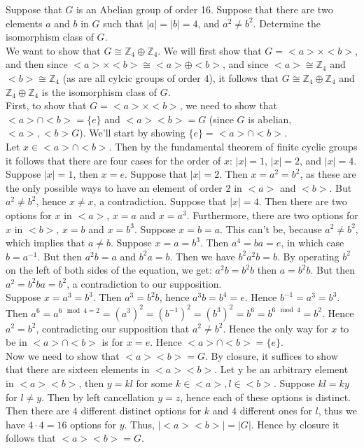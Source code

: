 \documentclass{article}
\newcommand{\Z}{\mathbb{Z}}
\begin{document}
 Suppose that $G$ is an Abelian group of order 16. Suppose that there are two elements $a$ and $b$ in $G$ such that $|a| = |b| = 4$, and $a^2 \ne b^2$. Determine the isomorphism class of $G$.\\

 We want to show that $G\cong \Z_4\oplus \Z_4$. We will first show that $G = <a>\times <b>$, and then since $<a>\times<b>\cong <a>\oplus<b>$, and since $<a>\cong \Z_4$ and $<b>\cong \Z_4$ (as are all cylcic groups of order $4$), it follows that $G\cong \Z_4\oplus\Z_4$ and $\Z_4\oplus \Z_4$ is the isomorphism class of $G$.\\

First, to show that $G = <a>\times <b>$, we need to show that $<a>\cap <b> = \{e\}$ and $<a><b> = G$ (since $G$ is abelian, $<a>,<b> G$). We'll start by showing $\{e\} = <a>\cap <b>$.\\

Let $x\in <a>\cap<b>$. Then by the fundamental theorem of finite cyclic groups it follows that there are four cases for the order of $x$: $|x| = 1$, $|x| = 2$, and $|x| = 4$.\\

Suppose $|x| = 1$, then $x = e$. Suppose that $|x| = 2$. Then $x = a^2 = b^2$, as these are the only possible ways to have an element of order 2 in $<a>$ and $<b>$. But $a^2 \ne b^2$, hence $x \ne x$, a contradiction. Suppose that $|x| = 4$. Then there are two options for $x$ in $<a>$, $x = a$ and $x = a^3$. Furthermore, there are two options for $x$ in $<b>$, $x = b$ and $x = b^3$. Suppose $x = b = a$. This can't be, because $a^2 \ne b^2$, which implies that $a \ne b$. Suppose $x = a = b^3$. Then $a^4 = ba = e$, in which case $b = a^{-1}$. But then $a^2b = a$ and $b^2a = b$. Then we have $b^2a^2 b = b.$ By operating $b^2$ on the left of both sides of the equation, we get: $a^2b = b^2 b$ then $a = b^2 b$. But then $a^2 = b^2 ba = b^2$, a contradiction to our supposition.\\

Suppose $x = a^3 = b^3$. Then $a^3 = b^2b$, hence $a^3b = b^4 = e$. Hence $b^{-1} = a^3 = b^3$. Then $a^6 = a^{6\mod 4 = 2} = (a^3)^2 = (b^{-1})^2 = (b^3)^2 = b^6 = b^{6 \mod 4} = b^2$. Hence $a^2 = b^2$, contradicting our supposition that $a^2 \ne b^2$. Hence the only way for $x$ to be in $<a>\cap <b>$ is for $x = e$. Hence $<a>\cap <b> = \{e\}$.\\

Now we need to show that $<a><b> = G$. By closure, it suffices to show that there are sixteen elements in $<a><b>$. Let y be an arbitrary element in $<a><b>$, then $y=kl$ for some $k \in <a>, l \in <b>$. Suppose $kl = ky $ for $l\ne y$. Then by left cancellation $y = z$, hence each of these options is distinct. Then there are $4$ different distinct options for $k$ and $4$ different ones for $l$, thus we have $4\cdot 4=16$ options for $y$. Thus, $|<a><b>|=|G|$. Hence by closure it follows that $<a><b> = G$.\\
\end{document}
